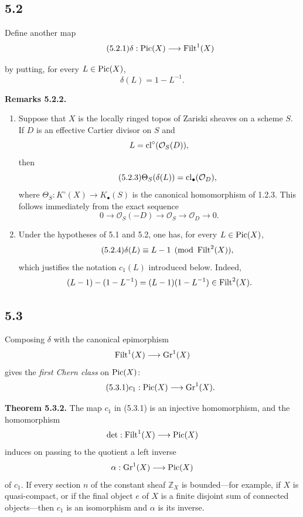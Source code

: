 \subsection*{5.2}
Define another map
\begin{equation}\tag{5.2.1}
\delta:\operatorname{Pic}(X)\longrightarrow\operatorname{Filt}^1(X)
\end{equation}

by putting, for every $L\in\operatorname{Pic}(X)$,
\[
\delta(L)=1-L^{-1}.
\]

\textbf{Remarks 5.2.2.}
\begin{enumerate}[label=\alph*)]
\item Suppose that $X$ is the locally ringed topos of Zariski sheaves on a
scheme $S$. If $D$ is an effective Cartier divisor on $S$ and
\[
L=\operatorname{cl}^\circ(\mathcal O_S(D)),
\]
then
\begin{equation}\tag{5.2.3}
\Theta_S(\delta(L))=\operatorname{cl}_\bullet(\mathcal O_D),
\end{equation}
where $\Theta_S:K^\circ(X)\to K_\bullet(S)$ is the canonical homomorphism of
1.2.3. This follows immediately from the exact sequence
\[
0\longrightarrow\mathcal O_S(-D)\longrightarrow\mathcal O_S
\longrightarrow\mathcal O_D\longrightarrow0.
\]

\item Under the hypotheses of 5.1 and 5.2, one has, for every
$L\in\operatorname{Pic}(X)$,
\begin{equation}\tag{5.2.4}
\delta(L)\equiv L-1\pmod{\operatorname{Filt}^2(X)},
\end{equation}
which justifies the notation $c_1(L)$ introduced below. Indeed,
\[
(L-1)-(1-L^{-1})=(L-1)(1-L^{-1})\in\operatorname{Filt}^2(X).
\]
\end{enumerate}

\subsection*{5.3}
Composing $\delta$ with the canonical epimorphism
\[
\operatorname{Filt}^1(X)\longrightarrow\operatorname{Gr}^1(X)
\]
gives the \emph{first Chern class} on $\operatorname{Pic}(X)$:
\begin{equation}\tag{5.3.1}
c_1:\operatorname{Pic}(X)\longrightarrow\operatorname{Gr}^1(X).
\end{equation}

\textbf{Theorem 5.3.2.}
The map $c_1$ in (5.3.1) is an injective homomorphism, and the homomorphism
\[
\det:\operatorname{Filt}^1(X)\longrightarrow\operatorname{Pic}(X)
\]
induces on passing to the quotient a left inverse
\[
\alpha:\operatorname{Gr}^1(X)\longrightarrow\operatorname{Pic}(X)
\]
of $c_1$. If every section $n$ of the constant sheaf $\mathbb Z_X$ is
bounded---for example, if $X$ is quasi-compact, or if the final object $e$ of
$X$ is a finite disjoint sum of connected objects---then $c_1$ is an
isomorphism and $\alpha$ is its inverse.

